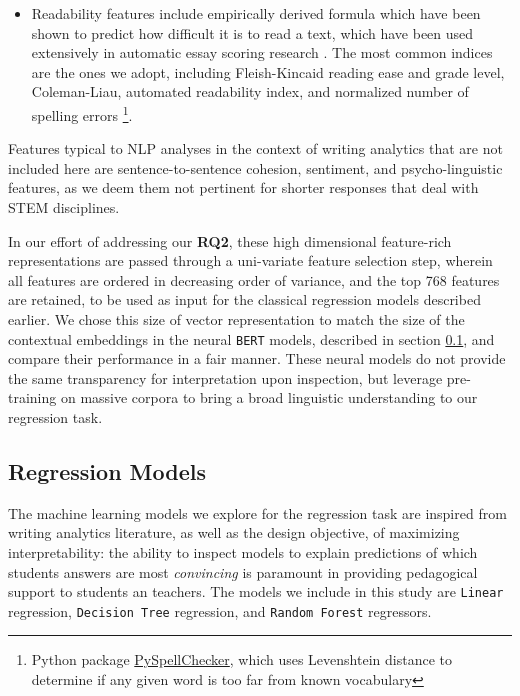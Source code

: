 \documentclass[notitlepage,12pt]{jedm}
\begin{document}
\begin{itemize}
	\item Readability features include empirically derived formula which have 
	been shown to predict how difficult it is to read a text, which have been 
	used extensively in automatic essay scoring research 
	\cite{graesser_coh-metrix:_2004}.
	The most common indices are the ones we adopt, including  
	Fleish-Kincaid reading ease and grade level,
	Coleman-Liau,
	automated readability index, and 
	normalized number of spelling errors 
	\footnote{Python package 
	\href{https://pypi.org/project/pyspellchecker/}{PySpellChecker}, 
	which uses Levenshtein distance to determine if any given word is too far 
	from known vocabulary}. 

	
\end{itemize}

Features typical to NLP analyses in the context of writing analytics that are 
not included here are sentence-to-sentence cohesion, sentiment, and 
psycho-linguistic features, as we deem them not pertinent for shorter responses 
that deal with STEM disciplines.

In our effort of addressing our \textbf{RQ2}, these high dimensional 
feature-rich representations are passed through a uni-variate feature selection 
step, wherein all features are ordered in decreasing order of variance, and the 
top 768 features are retained, to be used as input for the classical regression 
models described earlier.  
We chose this size of vector representation to match the size of the contextual 
embeddings in the neural \verb|BERT| models, described in section 
\ref{sec:regress_models}, and compare their performance in a fair manner.
These neural models do not provide the same transparency for interpretation 
upon inspection, but leverage pre-training on massive corpora to bring a broad 
linguistic understanding to our regression task.


\subsection{Regression Models}\label{sec:regress_models}

The machine learning models we explore for the regression task are
inspired from writing analytics literature, as well as the design objective, of 
maximizing interpretability: the ability to inspect models to explain 
predictions of which students answers are most \textit{convincing} is paramount 
in providing pedagogical support to students an teachers.
The models we include in this study are \verb|Linear| regression, 
\verb|Decision Tree| regression, and \verb|Random Forest| regressors.
\end{document}
